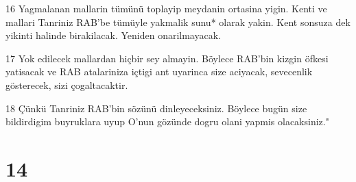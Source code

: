 \par 16 Yagmalanan mallarin tümünü toplayip meydanin ortasina yigin. Kenti ve mallari Tanriniz RAB'be tümüyle yakmalik sunu* olarak yakin. Kent sonsuza dek yikinti halinde birakilacak. Yeniden onarilmayacak.
\par 17 Yok edilecek mallardan hiçbir sey almayin. Böylece RAB'bin kizgin öfkesi yatisacak ve RAB atalariniza içtigi ant uyarinca size aciyacak, sevecenlik gösterecek, sizi çogaltacaktir.
\par 18 Çünkü Tanriniz RAB'bin sözünü dinleyeceksiniz. Böylece bugün size bildirdigim buyruklara uyup O'nun gözünde dogru olani yapmis olacaksiniz."

\chapter{14}

